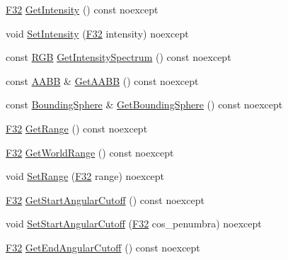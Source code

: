 \begin{DoxyCompactItemize}
\item 
\hyperlink{namespacemage_aa97e833b45f06d60a0a9c4fc22ae02c0}{F32} \hyperlink{classmage_1_1rendering_1_1_spot_light_ac3fe64c6d599149cf569693f74ac41e8}{Get\+Intensity} () const noexcept
\item 
void \hyperlink{classmage_1_1rendering_1_1_spot_light_aa59f043d14fb1e66377c9462c350717f}{Set\+Intensity} (\hyperlink{namespacemage_aa97e833b45f06d60a0a9c4fc22ae02c0}{F32} intensity) noexcept
\item 
const \hyperlink{structmage_1_1_r_g_b}{R\+GB} \hyperlink{classmage_1_1rendering_1_1_spot_light_a049401f9c26b106acddfcb7ec09b0418}{Get\+Intensity\+Spectrum} () const noexcept
\item 
const \hyperlink{classmage_1_1_a_a_b_b}{A\+A\+BB} \& \hyperlink{classmage_1_1rendering_1_1_spot_light_a09e58c11a2f81de811c4d8e51c5d13c3}{Get\+A\+A\+BB} () const noexcept
\item 
const \hyperlink{classmage_1_1_bounding_sphere}{Bounding\+Sphere} \& \hyperlink{classmage_1_1rendering_1_1_spot_light_a003e42ab1d3059ae5750893bcaa8e0b3}{Get\+Bounding\+Sphere} () const noexcept
\item 
\hyperlink{namespacemage_aa97e833b45f06d60a0a9c4fc22ae02c0}{F32} \hyperlink{classmage_1_1rendering_1_1_spot_light_a14383d05dafe535cf0cc162e3015181e}{Get\+Range} () const noexcept
\item 
\hyperlink{namespacemage_aa97e833b45f06d60a0a9c4fc22ae02c0}{F32} \hyperlink{classmage_1_1rendering_1_1_spot_light_a13b573af8d6131b6bf426362088a2a56}{Get\+World\+Range} () const noexcept
\item 
void \hyperlink{classmage_1_1rendering_1_1_spot_light_a87711b67a7a16809711f9841e4708720}{Set\+Range} (\hyperlink{namespacemage_aa97e833b45f06d60a0a9c4fc22ae02c0}{F32} range) noexcept
\item 
\hyperlink{namespacemage_aa97e833b45f06d60a0a9c4fc22ae02c0}{F32} \hyperlink{classmage_1_1rendering_1_1_spot_light_ab865663954e848ad42c84e759c7ceea7}{Get\+Start\+Angular\+Cutoff} () const noexcept
\item 
void \hyperlink{classmage_1_1rendering_1_1_spot_light_a01db83a4c9e64ff48dc4152359abec84}{Set\+Start\+Angular\+Cutoff} (\hyperlink{namespacemage_aa97e833b45f06d60a0a9c4fc22ae02c0}{F32} cos\+\_\+penumbra) noexcept
\item 
\hyperlink{namespacemage_aa97e833b45f06d60a0a9c4fc22ae02c0}{F32} \hyperlink{classmage_1_1rendering_1_1_spot_light_aab94a7a9d5434d8e7913d7b52379841b}{Get\+End\+Angular\+Cutoff} () const noexcept
\item 

\end{DoxyCompactItemize}
